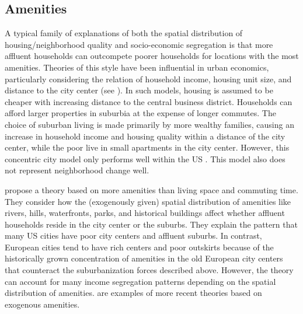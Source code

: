 \subsection{Amenities}

A typical family of explanations of both the spatial distribution of housing/neighborhood quality and socio-economic segregation is that more affluent households can outcompete poorer households for locations with the most amenities. Theories of this style have been influential in urban economics, particularly considering the relation of household income, housing unit size, and distance to the city center (see \cite{bruecknerLecturesUrbanEconomics2011}). In such models, housing is assumed to be cheaper with increasing distance to the central business district. Households can afford larger properties in suburbia at the expense of longer commutes. The choice of suburban living is made primarily by more wealthy families, causing an increase in household income and housing quality within a distance of the city center, while the poor live in small apartments in the city center. However, this concentric city model only performs well within the US \citep{bruecknerWhyCentralParis1999, quillianSocioeconomicSegregationLarge2016, gaigneWhoLivesWhere2022}. This model also does not represent neighborhood change well.

\citet{bruecknerWhyCentralParis1999} propose a theory based on more amenities than living space and commuting time. They consider how the (exogenously given) spatial distribution of amenities like rivers, hills, waterfronts, parks, and historical buildings affect whether affluent households reside in the city center or the suburbs. They explain the pattern that many US cities have poor city centers and affluent suburbs. In contrast, European cities tend to have rich centers and poor outskirts because of the historically grown concentration of amenities in the old European city centers that counteract the suburbanization forces described above. However, the theory can account for many income segregation patterns depending on the spatial distribution of amenities. \citet{leeNaturalAmenitiesNeighbourhood2018, gaigneWhoLivesWhere2022} are examples of more recent theories based on exogenous amenities. 

